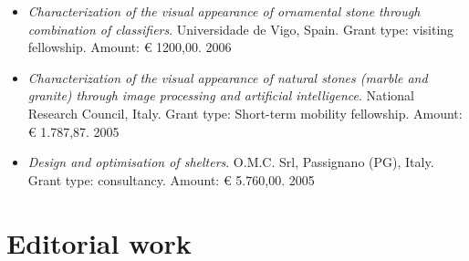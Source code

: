 \documentclass[11pt]{article}
\begin{document}
\begin{itemize}
	\item \emph{Characterization of the visual appearance of ornamental stone through combination of classifiers}. Universidade de Vigo, Spain. Grant type: visiting fellowship. Amount: € 1200,00. \hfill 2006
\end{itemize}

\begin{itemize}
	\item \emph{Characterization of the visual appearance of natural stones (marble and granite) through image processing and artificial intelligence}. National Research Council, Italy. Grant type: Short-term mobility fellowship. Amount: € 1.787,87. \hfill 2005
\end{itemize}

\begin{itemize}
	\item \emph{Design and optimisation of shelters}. O.M.C. Srl, Passignano (PG), Italy. Grant type: consultancy. Amount: € 5.760,00. \hfill 2005
\end{itemize}

\section*{Editorial work}
\end{document}
